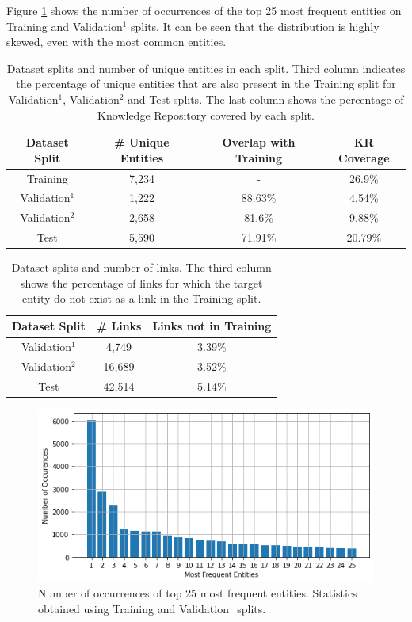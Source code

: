 \documentclass{report}
\theoremstyle{definition}
\theoremstyle{remark}
\begin{document}
Figure \ref{fig:entpopul} shows the number of occurrences of the top 25 most frequent entities on Training and Validation$^1$ splits. It can be seen that the distribution is highly skewed, even with the most common entities. 

\begin{table}[h!]
    \centering
    \begin{tabular}{cccc}
    Dataset Split & \# Unique Entities & Overlap with Training & KR Coverage\\
    \hline
    Training & 7,234 & - & 26.9\%\\
    Validation$^1$ & 1,222 & 88.63\% & 4.54\%\\
    Validation$^2$ & 2,658 & 81.6\% & 9.88\%\\
    Test & 5,590 & 71.91\%& 20.79\%\\
    \end{tabular}
    \caption{Dataset splits and number of unique entities in each split. Third column indicates the percentage of unique entities that are also present in the Training split for Validation$^1$, Validation$^2$ and Test splits. The last column shows the percentage of Knowledge Repository covered by each split.}
    \label{tab:goldstatsed2}
\end{table}

\begin{table}[h!]
    \centering
    \begin{tabular}{ccc}
    Dataset Split & \# Links & Links not in Training\\
    \hline
    Validation$^1$ & 4,749 & 3.39\% \\
    Validation$^2$ & 16,689 & 3.52\% \\
    Test & 42,514 & 5.14\% \\
    \end{tabular}
    \caption{Dataset splits and number of links. The third column shows the percentage of links for which the target entity do not exist as a link in the Training split.}
    \label{tab:goldstatsed3}
\end{table}

\begin{figure}[H]
    \centering
    \includegraphics[scale=0.6]{ent_occ.png}
    \caption{Number of occurrences of top 25 most frequent entities. Statistics obtained using Training and Validation$^1$ splits.}
    \label{fig:entpopul}
\end{figure}
\end{document}
